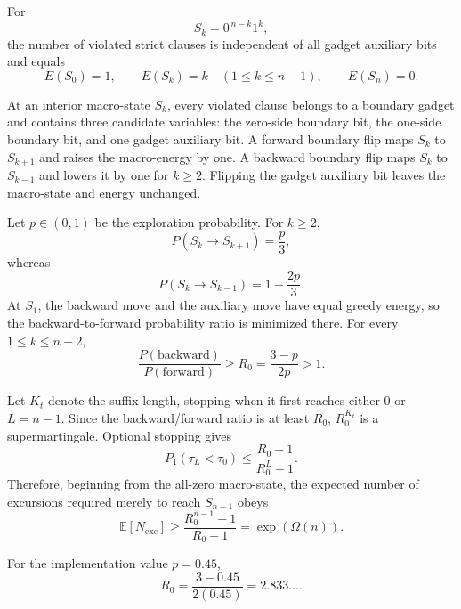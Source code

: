 For
\begin{equation}
S_k=0^{\,n-k}1^k,
\end{equation}
the number of violated strict clauses is independent of all gadget auxiliary
bits and equals
\begin{equation}
E(S_0)=1,\qquad
E(S_k)=k\quad(1\le k\le n-1),\qquad
E(S_n)=0.
\end{equation}

At an interior macro-state $S_k$, every violated clause belongs to a boundary
gadget and contains three candidate variables: the zero-side boundary bit,
the one-side boundary bit, and one gadget auxiliary bit.  A forward boundary
flip maps $S_k$ to $S_{k+1}$ and raises the macro-energy by one.  A backward
boundary flip maps $S_k$ to $S_{k-1}$ and lowers it by one for $k\ge2$.
Flipping the gadget auxiliary bit leaves the macro-state and energy unchanged.

Let $p\in(0,1)$ be the exploration probability.  For $k\ge2$,
\begin{equation}
P(S_k\to S_{k+1})=\frac{p}{3},
\end{equation}
whereas
\begin{equation}
P(S_k\to S_{k-1})=1-\frac{2p}{3}.
\end{equation}
At $S_1$, the backward move and the auxiliary move have equal greedy energy,
so the backward-to-forward probability ratio is minimized there.  For every
$1\le k\le n-2$,
\begin{equation}
\frac{P(\mathrm{backward})}{P(\mathrm{forward})}
\ge
R_0
=
\frac{3-p}{2p}
>1.
\end{equation}

Let $K_t$ denote the suffix length, stopping when it first reaches either
$0$ or $L=n-1$.  Since the backward/forward ratio is at least $R_0$,
$R_0^{K_t}$ is a supermartingale.  Optional stopping gives
\begin{equation}
P_1(\tau_L<\tau_0)
\le
\frac{R_0-1}{R_0^L-1}.
\end{equation}
Therefore, beginning from the all-zero macro-state, the expected number of
excursions required merely to reach $S_{n-1}$ obeys
\begin{equation}
\mathbb E[N_{\mathrm{exc}}]
\ge
\frac{R_0^{n-1}-1}{R_0-1}
=
\exp(\Omega(n)).
\end{equation}

For the implementation value $p=0.45$,
\begin{equation}
R_0
=
\frac{3-0.45}{2(0.45)}
=
2.833\ldots.
\end{equation}

